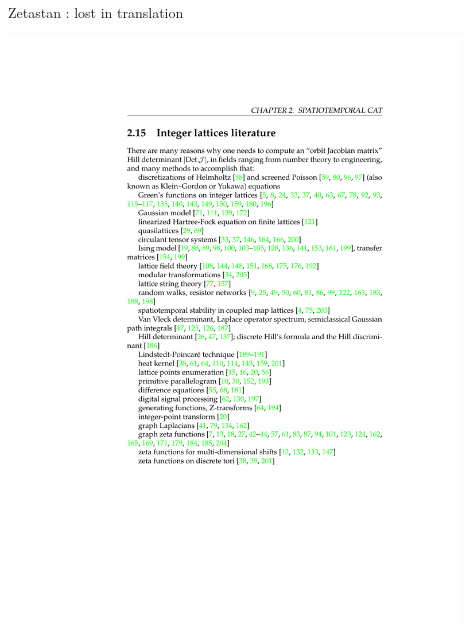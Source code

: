 \begin{frame}{Zetastan : lost in translation}
\begin{center}
\hfill\includegraphics[width=0.90\textwidth]{../kittens/lattLitClip1}
\end{center}
\end{frame} %

